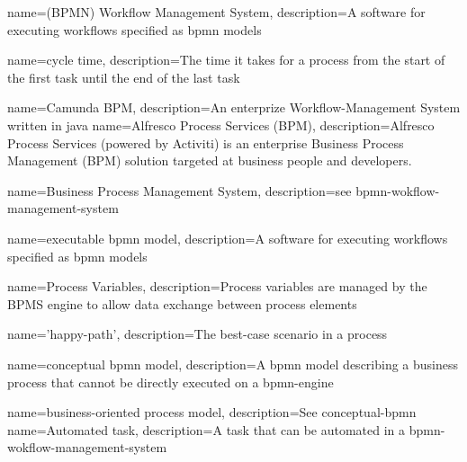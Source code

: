

{
	name={(BPMN) Workflow Management System},
	description={A software for executing workflows specified as \gls{bpmn} models}
}

{
	name={cycle time},
	description={The time it takes for a process from the start of the first task until the end of the last task \cite{Six-sigma-terms}}
}

{
	name={Camunda BPM},
	description={An enterprize Workflow-Management System written in java \cite{camunda-description}}
}
{
	name={Alfresco Process Services (BPM)},
	description={Alfresco Process Services (powered by Activiti) is an enterprise Business Process Management (BPM) solution targeted at business people and developers. \cite{alfresco-description}}
}


{
	name={Business Process Management System},
	description={see \gls{bpmn-wokflow-management-system}}
}

{
	name={executable \gls{bpmn} model},
	description={A software for executing workflows specified as \gls{bpmn} models}
}

{
	name={Process Variables},
	description={Process variables are managed by the BPMS engine to allow data exchange between process elements}
}

{
	name={'happy-path'},
	description={The best-case scenario in a process}
}

{
	name={conceptual \gls{bpmn} model},
	description={A \gls{bpmn} model describing a business process that cannot be directly executed on a \gls{bpmn-engine}}
}

{
	name={business-oriented process model},
	description={See \gls{conceptual-bpmn}}
}
{
	name={Automated task},
	description={A task that can be automated in a \gls{bpmn-wokflow-management-system}}
}


